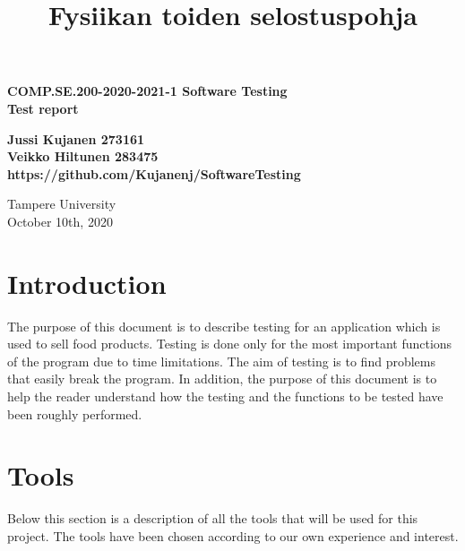 \documentclass[a4paper, 12pt]{article}
\title{Fysiikan toiden selostuspohja}
\begin{document}
\begin{titlepage}
    \begin{center}
        \vspace*{1cm}
 
        \textbf{COMP.SE.200-2020-2021-1 Software Testing}
        \\
        \textbf{Test report}
 
        \vspace{0.5cm}
       
             
        \vspace{1.5cm}

        \textbf{Jussi Kujanen 273161}
        \\
        \textbf{Veikko Hiltunen 283475}
        \\
        \textbf{https://github.com/Kujanenj/SoftwareTesting}
 
        \vfill
        \vspace{0.8cm}
        Tampere University\\
        October 10th, 2020
    \end{center}
 \end{titlepage} 



\newpage
\thispagestyle{empty}
\tableofcontents

\newpage
\clearpage
{} 

\section{Introduction}

The purpose of this document is to describe testing for an application which is used to sell food products. Testing is done only for the most important 
functions of the program due to time limitations. The aim of testing is to find problems that easily break the program. In addition, the purpose of this 
document is to help the reader understand how the testing and the functions to be tested have been roughly performed. 

\section{Tools}

Below this section is a description of all the tools that will be used for this project. The tools have been chosen according to our own experience and interest. 
\end{document}
